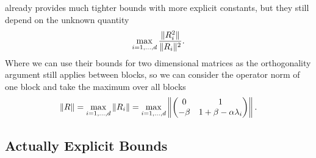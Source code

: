 \textcite{kozyakinAccuracyApproximationSpectral2009} already provides much tighter
bounds with more explicit constants, but they still depend on the unknown quantity
\begin{align*}
	\max_{i=1,\dots,d}\frac{\|R_i^2\|}{\|R_i\|^2}.
\end{align*}
Where we can use their bounds for two dimensional matrices as the orthogonality
argument still applies between blocks, so we can consider the operator norm of
one block and take the maximum over all blocks
\begin{align*}
	\|R\| = \max_{i=1,\dots,d}\|R_i\|
	= \max_{i=1,\dots,d}\left\|
	\begin{pmatrix}
		0 & 1 \\
		-\beta & 1+\beta-\alpha\lambda_i
	\end{pmatrix}
	\right\|.
\end{align*}

\subsection{Actually Explicit Bounds}

